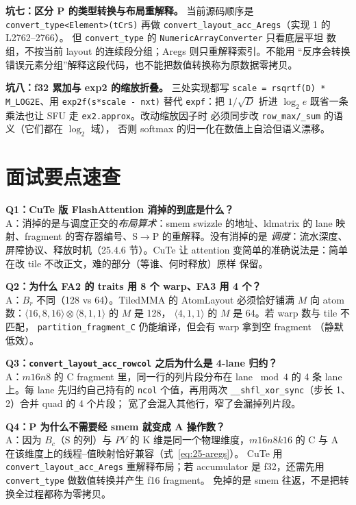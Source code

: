 \textbf{坑七：区分 P 的类型转换与布局重解释。}
当前源码顺序是 \texttt{convert\_\allowbreak{}type\allowbreak{}<Element>\allowbreak{}(t\allowbreak{}Cr\allowbreak{}S)} 再做
\texttt{convert\_\allowbreak{}layout\_\allowbreak{}acc\_\allowbreak{}Aregs}（实现 1 的 L2762--2766）。
但 \texttt{convert\_\allowbreak{}type} 的 \texttt{NumericArrayConverter} 只看底层平坦
数组，不按当前 layout 的连续段分组；Aregs 则只重解释索引。不能用
“反序会转换错误元素分组”解释这段代码，也不能把数值转换称为原数据零拷贝。

\textbf{坑八：f32 累加与 exp2 的缩放折叠。}
三处实现都写 \texttt{scale = rsqrtf(D) * M\_LOG2E}、用
\texttt{exp2f\allowbreak{}(s*scale - nxt)} 替代 \texttt{expf}：把 $1/\sqrt{D}$ 折进
$\log_2 e$ 既省一条乘法也让 SFU 走 \texttt{ex2.approx}。改动缩放因子时
必须同步改 \texttt{row\_\allowbreak{}max/\allowbreak{}\_\allowbreak{}sum} 的语义（它们都在 $\log_2$ 域），
否则 softmax 的归一化在数值上自洽但语义漂移。

\section{面试要点速查}

\textbf{Q1：CuTe 版 FlashAttention 消掉的到底是什么？}\\
A：消掉的是与调度正交的\emph{布局算术}：smem swizzle 的地址、ldmatrix 的
lane 映射、fragment 的寄存器编号、S$\to$P 的重解释。没有消掉的是
\emph{调度}：流水深度、屏障协议、释放时机（25.4.6 节）。CuTe 让 attention
变简单的准确说法是：简单在改 tile 不改正文，难的部分（等谁、何时释放）原样
保留。

\textbf{Q2：为什么 FA2 的 traits 用 8 个 warp、FA3 用 4 个？}\\
A：$B_r$ 不同（128 vs 64）。TiledMMA 的 AtomLayout 必须恰好铺满 $M$ 向
atom 数：$\langle16,8,16\rangle\otimes\langle8,1,1\rangle$ 的 $M$ 是 128，
$\langle4,1,1\rangle$ 的 $M$ 是 64。若 warp 数与 tile 不匹配，
\texttt{partition\_\allowbreak{}fragment\_\allowbreak{}C} 仍能编译，但会有 warp 拿到空 fragment
（静默低效）。

\textbf{Q3：\texttt{convert\_\allowbreak{}layout\_\allowbreak{}acc\_\allowbreak{}rowcol} 之后为什么是 4-lane 归约？}\\
A：$m16n8$ 的 C fragment 里，同一行的列片段分布在 lane $\bmod 4$ 的
4 条 lane 上。每 lane 先归约自己持有的 \texttt{ncol} 个值，再用两次
\texttt{\_\allowbreak{}\_\allowbreak{}shfl\_\allowbreak{}xor\_\allowbreak{}sync}（步长 1、2）合并 quad 的 4 个片段；
宽了会混入其他行，窄了会漏掉列片段。

\textbf{Q4：P 为什么不需要经 smem 就变成 A 操作数？}\\
A：因为 $B_c$（S 的列）与 $PV$ 的 K 维是同一个物理维度，$m16n8k16$ 的
C 与 A 在该维度上的线程--值映射恰好兼容（式~\eqref{eq:25-aregs}）。
CuTe 用 \texttt{convert\_layout\_acc\_Aregs} 重解释布局；若 accumulator
是 f32，还需先用 \texttt{convert\_type} 做数值转换并产生 f16 fragment。
免掉的是 smem 往返，不是把转换全过程都称为零拷贝。


